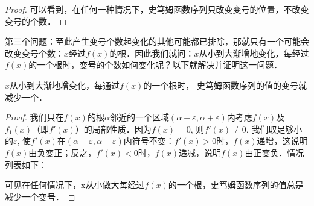 \begin{proof}
可以看到，在任何一种情况下，史笃姆函数序列只改变变号的位置，不改变变号的个数．
\end{proof}

第三个问题：至此产生变号个数起变化的其他可能都已排除，那就只有一个可能会改变变号个数：$x$经过$f(x)$的根．因此我们就问：$x$从小到大渐增地变化，每经过$f(x)$的一个根时，变号的个数如何变化呢？以下就解决并证明这一问题．

\begin{blk}{}
$x$从小到大渐地增变化，每通过$f(x)$的一个根时，
史笃姆函数序列的值的变号就减少一个．
\end{blk}

\begin{proof}
我们只在$f(x)$的根$\alpha$邻近的一个区域$(\alpha-\varepsilon,\alpha+\varepsilon)$内考虑$f(x)$及$f_1(x)$（即$f'(x)$）的局部性质．因为$f(x)=0$, 
则$f'(x)\ne 0$. 我们取足够小的$\varepsilon$, 使$f'(x)$在$(\alpha-\varepsilon,\alpha+\varepsilon)$内符号不变：$f'(x)>0$时，$f(x)$递增，这说明$f(x)$由负变正；反之，$f'(x)<0$时，$f(x)$递减，说明$f(x)$由正变负．情况列表如下：
\begin{center}
    \end{center}

可见在任何情况下，x从小做大每经过$f(x)$的一个根，史笃姆函数序列的值总是减少一个变号．
\end{proof}

